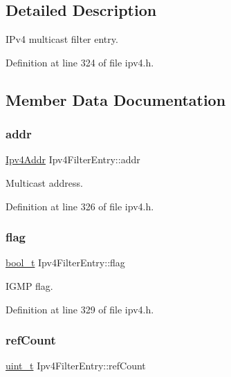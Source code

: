 \subsection{Detailed Description}
I\+Pv4 multicast filter entry. 

Definition at line 324 of file ipv4.\+h.



\subsection{Member Data Documentation}
\mbox{\label{structIpv4FilterEntry_a81c9fd6af892b3527845d3b39d3b256d}} 
\subsubsection{\texorpdfstring{addr}{addr}}
{\footnotesize\ttfamily \hyperlink{ipv4_8h_a411debb3d770caa0c06d3f73367da37f}{Ipv4\+Addr} Ipv4\+Filter\+Entry\+::addr}



Multicast address. 



Definition at line 326 of file ipv4.\+h.

\mbox{\label{structIpv4FilterEntry_a3821e585190d92f01df1529e828c124f}} 
\subsubsection{\texorpdfstring{flag}{flag}}
{\footnotesize\ttfamily \hyperlink{compiler__port_8h_a812d16e5494522586b3784e55d479912}{bool\+\_\+t} Ipv4\+Filter\+Entry\+::flag}



I\+G\+MP flag. 



Definition at line 329 of file ipv4.\+h.

\mbox{\label{structIpv4FilterEntry_a6841595a84b65414b1b30aa0ef5ef1e6}} 
\subsubsection{\texorpdfstring{ref\+Count}{refCount}}
{\footnotesize\ttfamily \hyperlink{compiler__port_8h_a12a1e9b3ce141648783a82445d02b58d}{uint\+\_\+t} Ipv4\+Filter\+Entry\+::ref\+Count}



